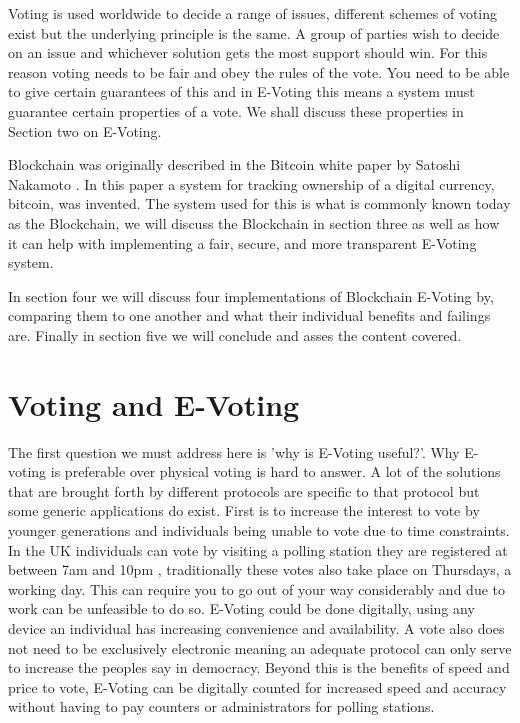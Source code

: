 \documentclass{llncs}
\begin{document}
Voting is used worldwide to decide a range of issues, different schemes of voting exist but the underlying principle is the same. A group of parties wish to decide on an issue and whichever solution gets the most support should win. For this reason voting needs to be fair and obey the rules of the vote. You need to be able to give certain guarantees of this and in E-Voting this means a system must guarantee certain properties of a vote. We shall discuss these properties in Section two on E-Voting.

Blockchain was originally described in the Bitcoin white paper by Satoshi Nakamoto \cite{BTCWhitepaper}. In this paper a system for tracking ownership of a digital currency, bitcoin, was invented. The system used for this is what is commonly known today as the Blockchain, we will discuss the Blockchain in section three as well as how it can help with implementing a fair, secure, and more transparent E-Voting system. 

In section four we will discuss four implementations of Blockchain E-Voting by, comparing them to one another and what their individual benefits and failings are. Finally in section five we will conclude and asses the content covered.

\section{Voting and E-Voting}

The first question we must address here is 'why is E-Voting useful?'. Why E-voting is preferable over physical voting is hard to answer. A lot of the solutions that are brought forth by different protocols are specific to that protocol but some generic applications do exist. First is to increase the interest to vote by younger generations and individuals being unable to vote due to time constraints. In the UK individuals can vote by visiting a polling station they are registered at between 7am and 10pm \cite{pollStations}, traditionally these votes also take place on Thursdays, a working day. This can require you to go out of your way considerably and due to work can be unfeasible to do so. E-Voting could be done digitally, using any device an individual has increasing convenience and availability. A vote also does not need to be exclusively electronic meaning an adequate protocol can only serve to increase the peoples say in democracy. Beyond this is the benefits of speed and price to vote, E-Voting can be digitally counted for increased speed and accuracy without having to pay counters or administrators for polling stations.
\end{document}
